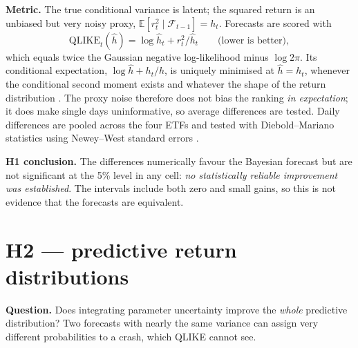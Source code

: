 \documentclass[11pt]{article}
\newcommand{\E}{\mathbb{E}}
\begin{document}
\textbf{Metric.} The true conditional variance is latent; the squared return is an unbiased but very noisy proxy,
$\E[r_t^2\mid\mathcal F_{t-1}]=h_t$. Forecasts are scored with
\begin{equation}
\text{QLIKE}_t(\hat h)=\log\hat h_t+r_t^2/\hat h_t\qquad\text{(lower is better)},
\end{equation}
which equals twice the Gaussian negative log-likelihood minus $\log2\pi$. Its conditional expectation,
$\log\hat h+h_t/\hat h$, is uniquely minimised at $\hat h=h_t$, whenever the conditional second moment exists and
whatever the shape of the return distribution \cite{patton2011}. The proxy noise therefore does not bias the ranking \emph{in
expectation}; it does make single days uninformative, so average differences are tested. Daily differences are
pooled across the four ETFs and tested with Diebold--Mariano statistics \cite{diebold1995} using Newey--West standard errors \cite{neweywest1987}.

\begin{table}[h]\centering\small
{}
\caption{H1. Negative values favour the Bayesian forecast. Average QLIKE levels are about $-8.3$.}\label{tab:h1}
\end{table}

\textbf{H1 conclusion.} The differences numerically favour the Bayesian forecast but are not significant at the 5\%
level in any cell: \emph{no statistically reliable improvement was established}. The intervals include both zero and
small gains, so this is not evidence that the forecasts are equivalent.

\section{H2 --- predictive return distributions}
\textbf{Question.} Does integrating parameter uncertainty improve the \emph{whole} predictive distribution? Two
forecasts with nearly the same variance can assign very different probabilities to a crash, which QLIKE cannot see.
\end{document}
